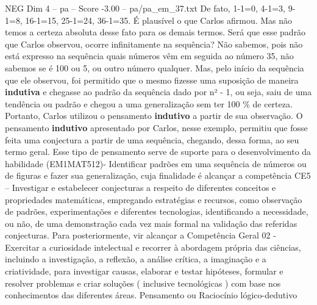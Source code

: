 \begin{textsample}{NEG Dim 4 – pa – Score -3.00 – pa/pa\_em\_37.txt}
De fato, 1-1=0, 4-1=3, 9-1=8, 16-1=15, 25-1=24, 36-1=35.
É plausível o que Carlos afirmou.
Mas não temos a certeza absoluta desse fato para os demais termos.
Será que esse padrão que Carlos observou, ocorre infinitamente na sequência?
Não sabemos, pois não está expresso na sequência quais números vêm em seguida ao número 35, não sabemos se é 100 ou 5, ou outro número qualquer.
Mas, pelo início da sequência que ele observou, foi permitido que o mesmo fizesse uma suposição de maneira \textbf{indutiva} e chegasse ao padrão da sequência dado por n² - 1, ou seja, saiu de uma tendência ou padrão e chegou a uma generalização sem ter 100 \% de certeza.
Portanto, Carlos utilizou o pensamento \textbf{indutivo} a partir de sua observação.
O pensamento \textbf{indutivo} apresentado por Carlos, nesse exemplo, permitiu que fosse feita uma conjectura a partir de uma sequência, chegando, dessa forma, ao seu termo geral.
Esse tipo de pensamento serve de suporte para o desenvolvimento da habilidade (EM1MAT512)- Identificar padrões em uma sequência de números ou de figuras e fazer sua generalização, cuja finalidade é alcançar a competência CE5 – Investigar e estabelecer conjecturas a respeito de diferentes conceitos e propriedades matemáticas, empregando estratégias e recursos, como observação de padrões, experimentações e diferentes tecnologias, identificando a necessidade, ou não, de uma demonstração cada vez mais formal na validação das referidas conjecturas.
Para posteriormente, vir alcançar a Competência Geral 02 - Exercitar a curiosidade intelectual e recorrer à abordagem própria das ciências, incluindo a investigação, a reflexão, a análise crítica, a imaginação e a criatividade, para investigar causas, elaborar e testar hipóteses, formular e resolver problemas e criar soluções ( inclusive tecnológicas ) com base nos conhecimentos das diferentes áreas.
Pensamento ou Raciocínio lógico-dedutivo

\end{textsample}
